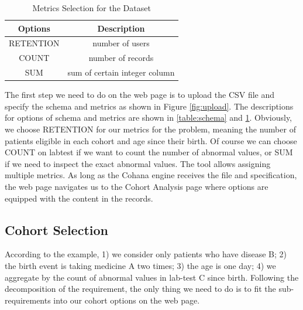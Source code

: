 \documentclass[10pt,conference,letterpaper]{IEEEtran}
\begin{document}
\begin{table}[h!]
\begin{center}
    \begin{tabular}{ | c | c | }
        \hline
        Options & Description \\[0.5ex] 
        \hline\hline
        RETENTION & number of users \\
        \hline
        COUNT & number of records \\
        \hline
        SUM & sum of certain integer column \\
        \hline
    \end{tabular}
\end{center}
\caption{Metrics Selection for the Dataset}
\label{table:metrics}
\end{table}

The first step we need to do on the web page is to upload the CSV file and specify the schema and metrics as shown in Figure \ref{fig:upload}. The descriptions for options of schema and metrics are shown in \ref{table:schema} and \ref{table:metrics}. Obviously, we choose RETENTION for our metrics for the problem, meaning the number of patients eligible in each cohort and age since their birth. Of course we can choose COUNT on labtest if we want to count the number of abnormal values, or SUM if we need to inspect the exact abnormal values. The tool allows assigning multiple metrics. As long as the Cohana engine receives the file and specification, the web page navigates us to the Cohort Analysis page where options are equipped with the content in the records.

\subsection{Cohort Selection}


According to the example, 1) we consider only patients who have disease B; 2) the birth event is taking medicine A two times; 3) the age is one day; 4) we aggregate by the count of abnormal values in lab-test C since birth. Following the decomposition of the requirement, the only thing we need to do is to fit the sub-requirements into our cohort options on the web page. 
\end{document}
